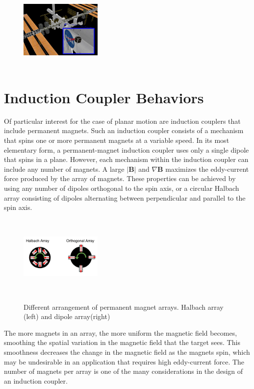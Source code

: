 \documentclass{article}
\begin{document}
\begin{figure}
\includegraphics[width = 4cm, height = 4cm ]{figures/iss_inspector.jpg}
\label{fig:iss_inspector}
\end{figure}\section{Induction Coupler Behaviors}

Of particular interest for the case of planar motion are induction couplers that include permanent magnets. Such an induction coupler consists of a mechanism that spins one or more permanent magnets at a variable speed. In its most elementary form, a permanent-magnet induction coupler uses only a single dipole that spins in a plane. However, each mechanism within the induction coupler can include any number of magnets. A large $\vert \textbf{B} \vert$ and $\nabla \textbf{B}$ maximizes the eddy-current force produced by the array of magnets. These properties can be achieved by using any number of dipoles orthogonal to the spin axis, or a circular Halbach array consisting of dipoles alternating between perpendicular and parallel to the spin axis.

\begin{figure}
\includegraphics[width = 4cm, height = 4cm ]{figures/Magnet_Arrays.png}
\label{fig:magnet_arrays}
\caption{Different arrangement of permanent magnet arrays. Halbach array (left) and dipole array(right)}
\end{figure}

The more magnets in an array, the more uniform the magnetic field becomes, smoothing the spatial variation in the magnetic field that the target sees. This smoothness decreases the change in the magnetic field as the magnets spin, which may be undesirable in an application that requires high eddy-current force. The number of magnets per array is one of the many considerations in the design of an induction coupler.
\end{document}

